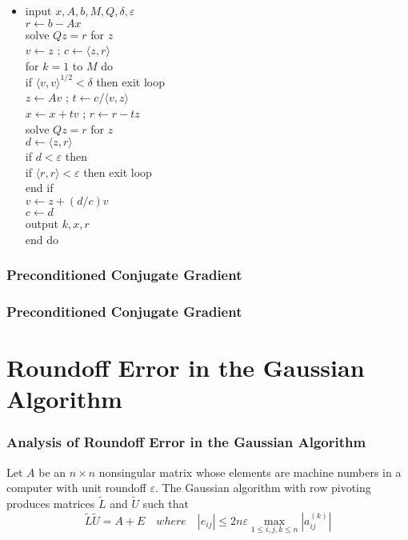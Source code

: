\documentclass[notheorems,mathserif,table,compress]{beamer}  %
\begin{document}
%
\begin{frame}
\begin{itemize}
\item 
input $x,A,b,M,Q,\delta,\varepsilon$\\
$r\leftarrow b-Ax$\\
solve $Qz=r$ for $z$\\
$v\leftarrow z$ ;
$c\leftarrow \langle z,r\rangle$\\
for $k=1$ to $M$ do\\
\qquad if $\langle v,v\rangle^{1/2}<\delta$ then exit loop\\
\qquad$z\leftarrow Av$ ;
$t\leftarrow c/\langle v,z\rangle$\\
\qquad$x\leftarrow x+tv$ ;
$r\leftarrow r-tz$\\
\qquad solve $Qz=r$ for $z$\\
\qquad$d\leftarrow \langle z,r\rangle$\\
\qquad if $d<\varepsilon$ then\\
\qquad \qquad if $\langle r,r\rangle<\varepsilon$ then exit loop\\
\qquad end if\\ 
\qquad$v\leftarrow z+(d/c)v$\\
\qquad$c\leftarrow d$\\
\qquad output $k,x,r$\\
end do
\end{itemize}
\end{frame}

%
\begin{frame}
\frametitle{Preconditioned Conjugate Gradient}

\end{frame}

%
\begin{frame}
\frametitle{Preconditioned Conjugate Gradient}

\end{frame}

\section{Roundoff Error in the Gaussian Algorithm}

%
\begin{frame}
\frametitle{Analysis of Roundoff Error in the Gaussian Algorithm}
\begin{theorem}
Let $A$ be an $n\times n$ nonsingular matrix whose elements are machine numbers in a computer with unit roundoff $\varepsilon$. The Gaussian algorithm with row pivoting produces matrices $\tilde{L}$ and $\tilde{U}$ such that 
\begin{displaymath}
\tilde{L}\tilde{U}=A+E \quad where \quad |e_{ij}|\leq 2n\varepsilon \max_{1\leq i,j,k\leq n}|a_{ij}^{(k)}|
\end{displaymath}

\end{theorem}
\end{frame}
\end{document}
